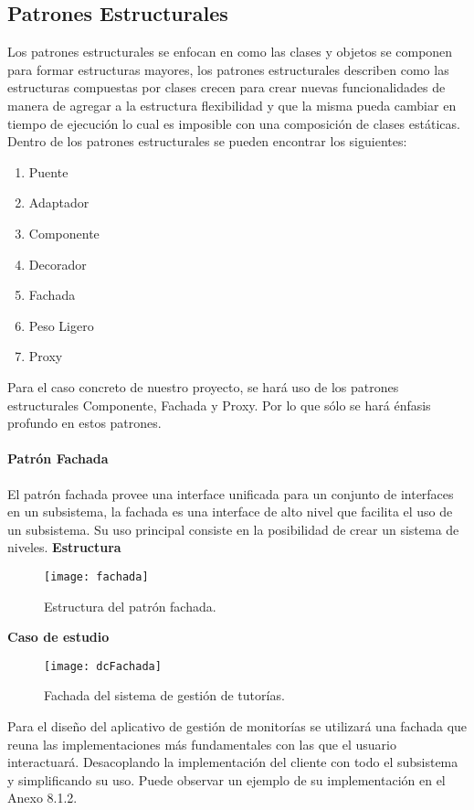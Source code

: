 \subsection{Patrones Estructurales}
Los patrones estructurales se enfocan en como las clases y objetos se componen para formar
estructuras mayores, los patrones estructurales describen como las estructuras compuestas por clases
crecen para crear nuevas funcionalidades de manera de agregar a la estructura flexibilidad y que la
misma pueda cambiar en tiempo de ejecución lo cual es imposible con una composición de clases
estáticas\cite{estruct}.
Dentro de los patrones estructurales se pueden encontrar los siguientes:
\begin{enumerate}
\item Puente
\item Adaptador
\item Componente
\item Decorador
\item Fachada
\item Peso Ligero
\item Proxy
\end{enumerate}

Para el caso concreto de nuestro proyecto, se hará uso de los patrones estructurales Componente, Fachada y Proxy. Por lo que sólo se hará énfasis profundo en estos patrones.
\paragraph{Patrón Fachada}
\indent El patrón fachada provee una interface unificada para un conjunto de interfaces en un subsistema, la fachada es una interface de alto nivel que facilita el uso de un subsistema. Su uso principal consiste en la posibilidad de crear un sistema de niveles\cite{Bol_2014}.
\newline
\indent\textbf{Estructura}
\newline
\begin{figure}[H]
	\centering
	\texttt{[image: fachada]}
    \centering
    \caption{Estructura del patrón fachada.}
	\label{fig:eFachada}
\end{figure}
\indent\textbf{Caso de estudio}
\begin{figure}[H]
	\centering
	\texttt{[image: dcFachada]}
    \centering
    \caption{Fachada del sistema de gestión de tutorías.}
	\label{fig:dcFachada}
\end{figure}
\indent Para el diseño del aplicativo de gestión de monitorías se utilizará una fachada que reuna las implementaciones más fundamentales con las que el usuario interactuará. Desacoplando la implementación del cliente con todo el subsistema y simplificando su uso. Puede observar un ejemplo de su implementación en el Anexo 8.1.2.
\newpage
